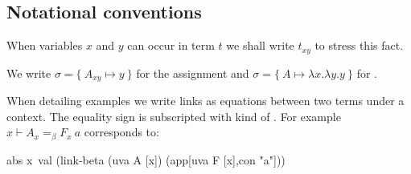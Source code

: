 \documentclass[sigconf,natbib=false,review]{acmart}
\newcommand{\linkbetaM}[3]{\ensuremath{#1 \vdash #2 =_\beta #3}}
\begin{document}


\subsection{Notational conventions}


\noindent
When variables $x$ and $y$ can occur in term $t$ we shall write
$t_{xy}$ to stress this fact. 

We write $\sigma = \{~ A_{xy} \mapsto y ~\}$ for the assignment
 and $\sigma = \{~ A \mapsto \lambda x.\lambda y.y ~\}$
for .

When detailing examples we write links as equations between two
terms under a context.
The equality sign is subscripted with
kind of . For example $\linkbetaM{x}{A_x}{F_x~a}$ corresponds to:
\begin{elpicode}
abs x\ val (link-beta (uva A [x]) (app[uva F [x],con "a"]))
\end{elpicode}






\end{document}
